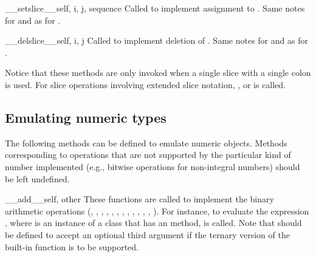\begin{methoddescni}{__setslice__}{self, i, j, sequence}
Called to implement assignment to .
Same notes for  and  as for .
\end{methoddescni}

\begin{methoddescni}{__delslice__}{self, i, j}
Called to implement deletion of .
Same notes for  and  as for .
\end{methoddescni}

Notice that these methods are only invoked when a single slice with a
single colon is used.  For slice operations involving extended slice
notation, , 
or is called.

\subsection{Emulating numeric types\label{numeric-types}}

The following methods can be defined to emulate numeric objects.
Methods corresponding to operations that are not supported by the
particular kind of number implemented (e.g., bitwise operations for
non-integral numbers) should be left undefined.

\begin{methoddescni}{__add__}{self, other}
These functions are
called to implement the binary arithmetic operations (\code{+},
\code{-}, \code{*}, \code{/}, \code{\%},
,
, \code{**}, \code{<<}, \code{>>},
\code{\&}, \code{\^}, \code{|}).  For instance, to evaluate the
expression \code{+}, where  is an instance of a
class that has an  method,
 is called.  Note that
 should be defined to accept an optional third
argument if the ternary version of the built-in
 function is to be supported.
\end{methoddescni}


